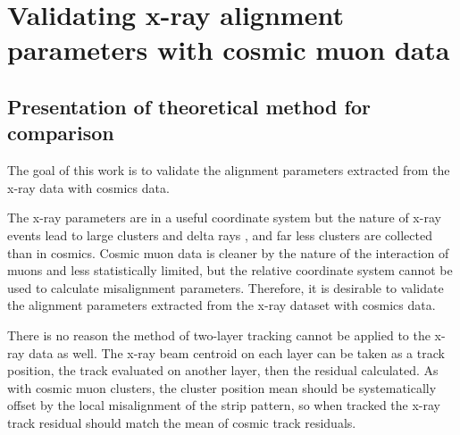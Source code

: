 
\chapter{Validating x-ray alignment parameters with cosmic muon data}
\label{chap:comparison}

\section{Presentation of theoretical method for comparison}

The goal of this work is to validate the alignment parameters extracted from the x-ray data with cosmics data. 

The x-ray parameters are in a useful coordinate system but the nature of x-ray events lead to large clusters and delta rays \cite{lefebvre_precision_2020}, and far less clusters are collected than in cosmics. Cosmic muon data is cleaner by the nature of the interaction of muons and less statistically limited, but the relative coordinate system cannot be used to calculate misalignment parameters. Therefore, it is desirable to validate the alignment parameters extracted from the x-ray dataset with cosmics data.

There is no reason the method of two-layer tracking cannot be applied to the x-ray data as well. The x-ray beam centroid on each layer can be taken as a track position, the track evaluated on another layer, then the residual calculated. As with cosmic muon clusters, the cluster position mean should be systematically offset by the local misalignment of the strip pattern, so when tracked the x-ray track residual should match the mean of cosmic track residuals. 


